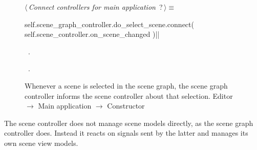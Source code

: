 \documentclass[%
    a4paper,    %
    justified,  %
    nobib,      %
    openany     %
]{tufte-book}
\begin{document}
\begin{figure}
\begin{flushleft} \small
\begin{minipage}{\linewidth}\label{scrap85}\raggedright\small
{} $\langle\,${\itshape Connect controllers for main application}\nobreak\ {\footnotesize {?}}$\,\rangle\equiv$
\vspace{-1ex}
\begin{pythoncode}
self.scene_graph_controller.do_select_scene.connect(
    self.scene_controller.on_scene_changed
)|\NWsep|
\end{pythoncode}
\vspace{1.5ex}
\footnotesize
\begin{list}{}{\setlength{\itemsep}{-\parsep}\setlength{\itemindent}{-\leftmargin}}
\item \NWtxtMacroDefBy\ .
\item \NWtxtMacroRefIn\ .

\item{}
\end{list}
\end{minipage}\vspace{4ex}
\end{flushleft}
\caption{Whenever a scene is selected in the scene graph, the scene graph
  controller informs the scene controller about that selection.
  \newline{}\newline{}Editor $\rightarrow$ Main application $\rightarrow$
  Constructor}
\label{editor:lst:main-application:constructor:connect-scene-controllers-select}
\end{figure}

The scene controller does not manage scene models directly, as the scene graph
controller does. Instead it reacts on signals sent by the latter and manages
its own scene view models.
\end{document}
